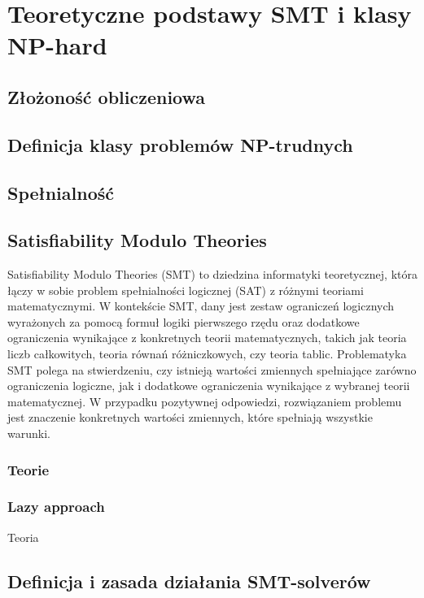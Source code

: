 \chapter{Teoretyczne podstawy SMT i klasy NP-hard}
\section{Złożoność obliczeniowa}

\section{Definicja klasy problemów NP-trudnych}

\section{Spełnialność}


\section{Satisfiability Modulo Theories}
	Satisfiability Modulo Theories (SMT) to dziedzina informatyki teoretycznej, która łączy w sobie problem spełnialności logicznej (SAT) z różnymi teoriami matematycznymi. 
	W kontekście SMT, dany jest zestaw ograniczeń logicznych wyrażonych za pomocą formuł logiki pierwszego rzędu oraz dodatkowe ograniczenia wynikające z konkretnych teorii matematycznych, takich jak teoria liczb całkowitych, teoria równań różniczkowych, czy teoria tablic.
	Problematyka SMT polega na stwierdzeniu, czy istnieją wartości zmiennych spełniające zarówno ograniczenia logiczne, jak i dodatkowe ograniczenia wynikające z wybranej teorii matematycznej. W przypadku pozytywnej odpowiedzi, rozwiązaniem problemu jest znaczenie konkretnych wartości zmiennych, które spełniają wszystkie warunki.
	\subsection{Teorie}
	\subsection{Lazy approach}
	Teoria 
\section{Definicja i zasada działania SMT-solverów}



